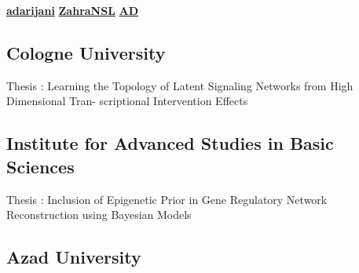 \documentclass[a4paper]{MagicalCV}
\begin{document}
\lastupdated

  \href{https://github.com/adarijani}{\bf adarijani} 
 \href{https://github.com/ZahraNSL}{\bf ZahraNSL}
 \href{https://www.linkedin.com/in/zahra-hs-nasrollah-439064a2/}{\bf AD}


\begin{minipage}[t]{0.66\textwidth} 


\subsection{Cologne University}
\vspace{\topsep} %
\begin{tightemize}
\item Thesis : Learning the Topology of Latent Signaling Networks from High Dimensional Tran-
scriptional Intervention Effects
\end{tightemize}
\sectionsep

\subsection{Institute for Advanced Studies in Basic Sciences}
\begin{tightemize}
\item Thesis : Inclusion of Epigenetic Prior in Gene Regulatory Network Reconstruction using
Bayesian Models
\end{tightemize}
\sectionsep

\subsection{Azad University}
\begin{tightemize}
\end{tightemize}
\sectionsep



\end{minipage}
\end{document}
